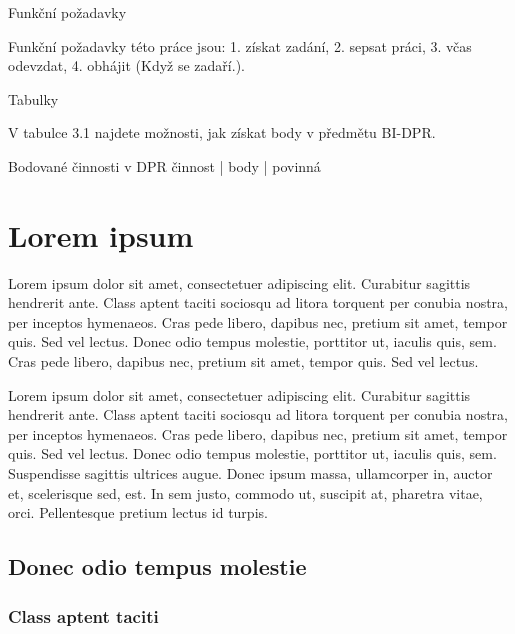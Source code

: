 Funkční požadavky

Funkční požadavky této práce jsou:
1. získat zadání, 
2. sepsat práci, 
3. včas odevzdat, 
4. obhájit (Když se zadaří.).

Tabulky

V tabulce 3.1 najdete možnosti, jak získat body v předmětu BI-DPR.

Bodované činnosti v DPR
     činnost | body | povinná

\chapter{Lorem ipsum}

\begin{chapterabstract}
	Lorem ipsum dolor sit amet, consectetuer adipiscing elit. Curabitur sagittis hendrerit ante. Class aptent taciti sociosqu ad litora torquent per conubia nostra, per inceptos hymenaeos. Cras pede libero, dapibus nec, pretium sit amet, tempor quis. Sed vel lectus. Donec odio tempus molestie, porttitor ut, iaculis quis, sem. Cras pede libero, dapibus nec, pretium sit amet, tempor quis. Sed vel lectus. 
\end{chapterabstract}

Lorem ipsum dolor sit amet, consectetuer adipiscing elit. Curabitur sagittis hendrerit ante. Class aptent taciti sociosqu ad litora torquent per conubia nostra, per inceptos hymenaeos. Cras pede libero, dapibus nec, pretium sit amet, tempor quis. Sed vel lectus. Donec odio tempus molestie, porttitor ut, iaculis quis, sem. Suspendisse sagittis ultrices augue. Donec ipsum massa, ullamcorper in, auctor et, scelerisque sed, est. In sem justo, commodo ut, suscipit at, pharetra vitae, orci. Pellentesque pretium lectus id turpis. \cite{Kopka2004}

\section{Donec odio tempus molestie}

\lipsum[2] \cite{def:1, def:2}

\subsection{Class aptent taciti}

\lipsum[2-3]

